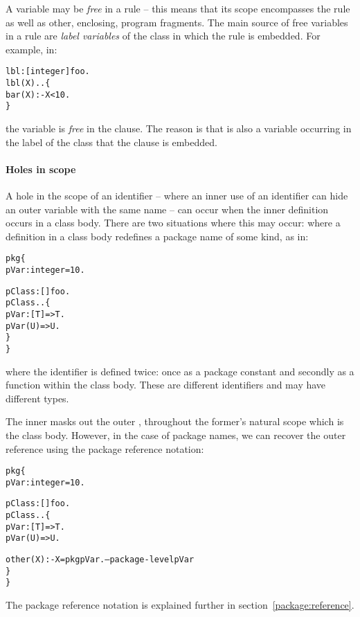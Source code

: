 A variable may be \emph{free} in a rule -- this means that its scope encompasses the rule as well as other, enclosing, program fragments. The main source of free variables in a rule are \emph{label variables} of the class in which the rule is embedded. For example, in:
\begin{alltt}
lbl:[integer] \conarrow foo.
lbl(X)..\{
  bar(X) :- X<10.
\}
\end{alltt}
the variable  is \emph{free} in the  clause. The reason is that  is also a variable occurring in the label  of the class that the  clause is embedded.

\paragraph{Holes in scope}
A hole in the scope of an identifier  -- where an inner use of an identifier can hide an outer variable with the same name -- can occur when the inner definition occurs in a class body. There are two situations where this may occur: where a definition in a class body redefines a package name of some kind, as in:
\begin{alltt}
pkg\{
  pVar:integer = 10.
  
  pClass:[]\conarrow{}foo.
  pClass..\{
    pVar:[T]=>T.
    pVar(U)=>U.
  \}
\}
\end{alltt}
where the  identifier is defined twice: once as a package constant and secondly as a function within the  class body. These are different identifiers and may have different types.

The inner  masks out the outer , throughout the former's natural scope which is the  class body. However, in the case of package names, we can recover the outer reference using the package reference notation:
\begin{alltt}
pkg\{
  pVar:integer = 10.
  
  pClass:[]\conarrow{}foo.
  pClass..\{
    pVar:[T]=>T.
    pVar(U) => U.
    
    other(X) :- X=pkg\hash{}pVar.   -- package-level pVar
  \}
\}
\end{alltt}
The package reference notation is explained further in section~\vref{package:reference}.

